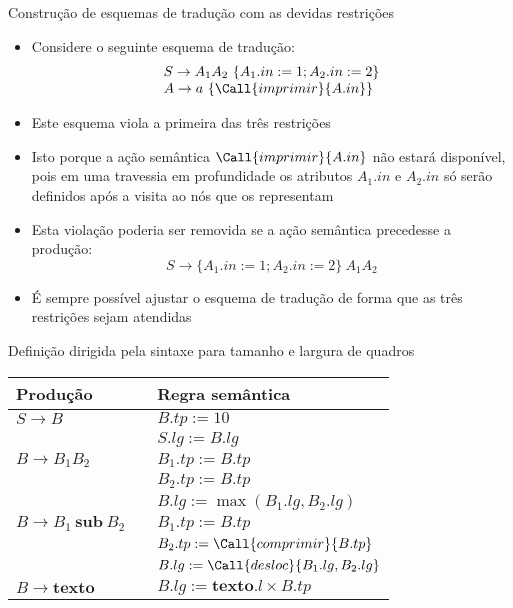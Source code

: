 \begin{frame}[fragile]{Construção de esquemas de tradução com as devidas restrições}

    \begin{itemize}
        \item Considere o seguinte esquema de tradução:
        \[
            \begin{array}{l}
                S\to A_1A_2\ \{A_1.in := 1; A_2.in := 2\} \\
                A \to a\ \{\Call{imprimir}{A.in}\}
            \end{array}
        \]

        \item Este esquema viola a primeira das três restrições

        \item Isto porque a ação semântica $\Call{imprimir}{A.in}$ não estará disponível, pois em uma travessia em profundidade os atributos $A_1.in$ e $A_2.in$
            só serão definidos após a visita ao nós que os representam

        \item Esta violação poderia ser removida se a ação semântica precedesse a produção:
        \[
                S\to \{A_1.in := 1; A_2.in := 2\}\ A_1A_2
        \]%

        \item É sempre possível ajustar o esquema de tradução de forma que as três restrições sejam atendidas
    \end{itemize}

\end{frame}

\begin{frame}[fragile]{Definição dirigida pela sintaxe para tamanho e largura de quadros}

    \begin{table}[h]
        \begin{tabular}{lp{2cm}l}
            \toprule
            \textbf{Produção} & & \textbf{Regra semântica} \\
            \midrule
            $S\to B$ & & $B.tp := 10$ \\
            & & $S.lg := B.lg$ \\
            \midrule
            $B\to B_1B_2$ & & $B_1.tp := B.tp$ \\
            & & $B_2.tp := B.tp$ \\
            & & $B.lg := \max(B_1.lg, B_2.lg)$\\
            \midrule
            $B\to B_1\ \textbf{sub}\ B_2$ & & $B_1.tp := B.tp$ \\
            & & $B_2.tp := \Call{comprimir}{B.tp}$ \\
            & & $B.lg := \Call{desloc}{B_1.lg, B_2.lg}$\\
            \midrule
            $B\to \textbf{texto}$ & & $B.lg := \textbf{texto}.l \times B.tp$ \\
            \bottomrule
        \end{tabular}
    \end{table}


\end{frame}

